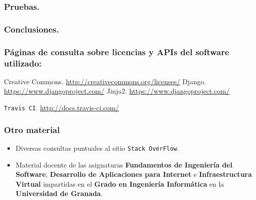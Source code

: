 \subsubsection*{Pruebas.}

\subsubsection*{Conclusiones.}

\subsubsection*{Páginas de consulta sobre licencias y APIs del software utilizado:}
 Creative Commons. \url{http://creativecommons.org/licenses/}
 Django. \url{https://www.djangoproject.com/}
 Jinja2. \url{https://www.djangoproject.com/}

 {\tt Travis CI}. \url{http://docs.travis-ci.com/}

\bigskip


\subsubsection*{Otro material}
\begin{itemize}
	\item Diversas consultas puntuales al sitio {\tt Stack OverFlow}.
	\item Material docente de las asignaturas \textbf{Fundamentos de Ingeniería del Software}, \textbf{Desarrollo de Aplicaciones para Internet} e \textbf{Infraestructura Virtual} impartidas en el \textbf{Grado en Ingeniería Informática} en la \textbf{Universidad de Granada}.
\end{itemize}
